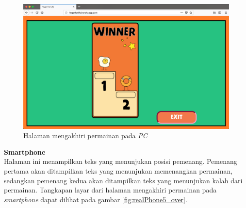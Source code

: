 \begin{enumerate}
	\begin{figure}[H]
		\centering
		\includegraphics[scale=0.25]{Gambar/realWeb5_over}
		\caption{Halaman mengakhiri permainan pada \textit{PC}}
		\label{fig:realWeb5_over}
	\end{figure}

	\textbf{Smartphone} \\
	Halaman ini menampilkan teks yang menunjukan posisi pemenang. Pemenang pertama akan ditampilkan teks yang menunjukan memenangkan permainan, sedangkan pemenang kedua akan ditampilkan teks yang menunjukan kalah dari permainan. Tangkapan layar dari halaman mengakhiri permainan pada \textit{smartphone} dapat dilihat pada gambar \ref{fig:realPhone5_over}.
	

\end{enumerate}
